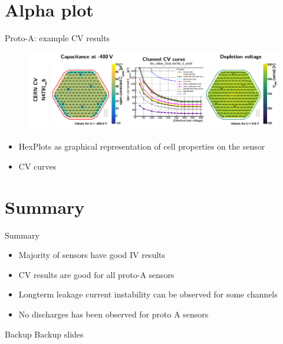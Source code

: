 \documentclass{beamer}
\begin{document}
\section{Alpha plot}

\begin{frame}{Proto-A: example CV results}
  \begin{figure}
      \includegraphics[width=1.0\textwidth]{plots/CV_example.png}    
  \end{figure}
  \begin{itemize}
    \item HexPlots as graphical representation of cell properties on the sensor
    \item CV curves
  \end{itemize}
\end{frame}


\section{Summary}
\begin{frame}{Summary}
  \begin{itemize}
    \item Majority of sensors have good IV results
    \item CV results are good for all proto-A sensors
    \item Longterm leakage current instability can be observed  for some channels
    \item No discharges has been observed for proto A sensors
  \end{itemize}
\end{frame}

\appendix

\begin{frame}{Backup}
	\center
	\huge
	Backup slides
\end{frame}
\end{document}
